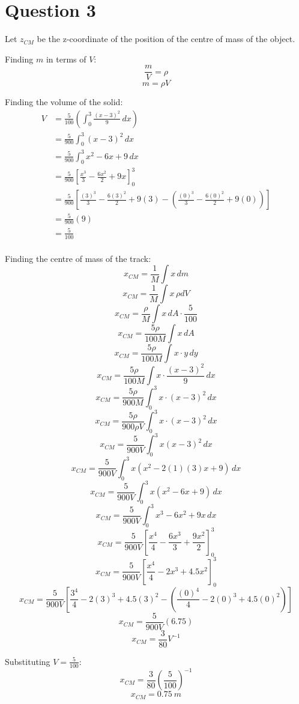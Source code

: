 \documentclass[11pt]{article}
\begin{document}
\newpage

\section{Question 3}
\label{sec:org890c951}
Let \(z_{CM}\) be the z-coordinate of the position of the centre of mass of the object.

Finding \(m\) in terms of \(V\):
\[\frac{m}{V} = \rho\]
\[m = \rho V\]

Finding the volume of the solid:
\begin{align*}
V &= \frac{5}{100} \left(\int_0^3 \frac{(x - 3)^2}{9} \, dx \right) \\
&= \frac{5}{900} \int_0^3 (x - 3)^2 \, dx \\
&= \frac{5}{900} \int_0^3 x^2 - 6x + 9 \, dx \\
&= \frac{5}{900} \left[\frac{x^3}{3} - \frac{6x^2}{2} + 9x \right]_0^3 \\
&= \frac{5}{900} \left[\frac{(3)^3}{3} - \frac{6(3)^2}{2} + 9(3) - \left( \frac{(0)^3}{3} - \frac{6(0)^2}{2} + 9(0) \right)\right] \\
&= \frac{5}{900} (9) \\
&= \frac{5}{100} \\
\end{align*}

Finding the centre of mass of the track:
\[x_{CM} = \frac{1}{M} \int x \, dm \]
\[x_{CM} = \frac{1}{M} \int x \, \rho dV \]
\[x_{CM} = \frac{\rho}{M} \int x \, dA \cdot \frac{5}{100} \]
\[x_{CM} = \frac{5 \rho}{100M} \int x \, dA \]
\[x_{CM} = \frac{5 \rho}{100M} \int x \cdot y \, dy \]
\[x_{CM} = \frac{5 \rho}{100M} \int x \cdot \frac{(x - 3)^2}{9} \, dx \]
\[x_{CM} = \frac{5 \rho}{900M} \int_0^3 x \cdot (x - 3)^2 \, dx \]
\[x_{CM} = \frac{5 \rho}{900 \rho V} \int_0^3 x \cdot (x - 3)^2 \, dx \]
\[x_{CM} = \frac{5}{900 V} \int_0^3 x (x - 3)^2 \, dx \]
\[x_{CM} = \frac{5}{900 V} \int_0^3 x (x^2 - 2(1)(3)x + 9) \, dx \]
\[x_{CM} = \frac{5}{900 V} \int_0^3 x (x^2 - 6x + 9) \, dx \]
\[x_{CM} = \frac{5}{900 V} \int_0^3 x^3 - 6x^2 + 9x \, dx \]
\[x_{CM} = \frac{5}{900 V} \left[\frac{x^4}{4} - \frac{6x^3}{3} + \frac{9x^2}{2} \right]_0^3 \]
\[x_{CM} = \frac{5}{900 V} \left[\frac{x^4}{4} - 2x^3 + 4.5x^2 \right]_0^3 \]
\[x_{CM} = \frac{5}{900 V} \left[\frac{3^4}{4} - 2(3)^3 + 4.5(3)^2 - \left(\frac{(0)^4}{4} - 2(0)^3 + 4.5(0)^2 \right) \right] \]
\[x_{CM} = \frac{5}{900 V} (6.75)\]
\[x_{CM} = \frac{3}{80} V^{-1}\]

Substituting \(V = \frac{5}{100}\):
\[x_{CM} = \frac{3}{80} \left(\frac{5}{100} \right)^{-1}\]
\[x_{CM} = \qty{0.75}{\unit{m}}\]
\end{document}
